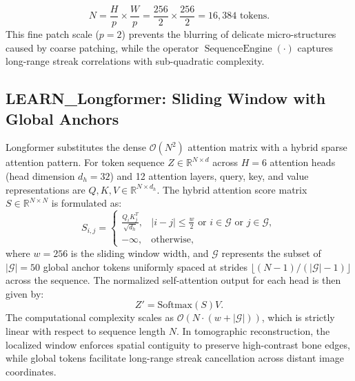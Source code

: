 \documentclass[runningheads]{llncs}
\begin{document}
\begin{equation}
N = \frac{H}{p} \times \frac{W}{p} = \frac{256}{2} \times \frac{256}{2} = 16,384 \text{ tokens}.
\end{equation}
This fine patch scale ($p = 2$) prevents the blurring of delicate micro-structures caused by coarse patching, while the operator $\operatorname{SequenceEngine}(\cdot)$ captures long-range streak correlations with sub-quadratic complexity.

\subsection{LEARN\_Longformer: Sliding Window with Global Anchors}
Longformer \cite{beltagy2020longformer} substitutes the dense $\mathcal{O}(N^2)$ attention matrix with a hybrid sparse attention pattern. For token sequence $Z \in \mathbb{R}^{N \times d}$ across $H = 6$ attention heads (head dimension $d_h = 32$) and 12 attention layers, query, key, and value representations are $Q, K, V \in \mathbb{R}^{N \times d_h}$. The hybrid attention score matrix $S \in \mathbb{R}^{N \times N}$ is formulated as:
\begin{equation}
S_{i, j} = \begin{cases} 
\frac{Q_i K_j^T}{\sqrt{d_h}}, & |i - j| \leq \frac{w}{2} \text{ or } i \in \mathcal{G} \text{ or } j \in \mathcal{G}, \\ 
-\infty, & \text{otherwise}, 
\end{cases}
\end{equation}
where $w = 256$ is the sliding window width, and $\mathcal{G}$ represents the subset of $|\mathcal{G}| = 50$ global anchor tokens uniformly spaced at strides $\lfloor (N-1)/(|\mathcal{G}|-1) \rfloor$ across the sequence. The normalized self-attention output for each head is then given by:
\begin{equation}
Z' = \text{Softmax}(S) V.
\end{equation}
The computational complexity scales as $\mathcal{O}(N \cdot (w + |\mathcal{G}|))$, which is strictly linear with respect to sequence length $N$. In tomographic reconstruction, the localized window enforces spatial contiguity to preserve high-contrast bone edges, while global tokens facilitate long-range streak cancellation across distant image coordinates.
\end{document}
